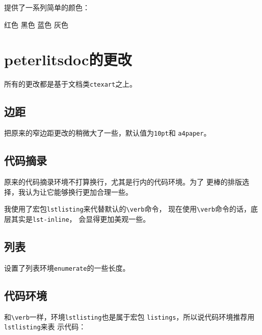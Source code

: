\documentclass{peterlitsdoc}
\newcommand{\vb}{\verb}
\begin{document}
提供了一系列简单的颜色：

\begin{pltrun}
\pltred   红色\pltrule
\pltblack 黑色\pltrule
\pltblue  蓝色\pltrule
\pltgray  灰色\pltrule
\end{pltrun}


\section{peterlitsdoc的更改}

所有的更改都是基于文档类\vb|ctexart|之上。


\subsection{边距}

把原来的窄边距更改的稍微大了一些，默认值为\vb|10pt|和
\vb|a4paper|。


\subsection{代码摘录}

原来的代码摘录环境不打算换行，尤其是行内的代码环境。为了
更棒的排版选择，我认为让它能够换行更加合理一些。

我使用了宏包\vb|lstlisting|来代替默认的\verb|\verb|命令，
现在使用\verb|\verb|命令的话，底层其实是\vb|lst-inline|，
会显得更加美观一些。


\subsection{列表}

设置了列表环境\vb|enumerate|的一些长度。


\subsection{代码环境}

和\verb|\verb|一样，环境\vb|lstlisting|也是属于宏包
\vb|listings|，所以说代码环境推荐用\vb|lstlisting|来表
示代码：
\end{document}
